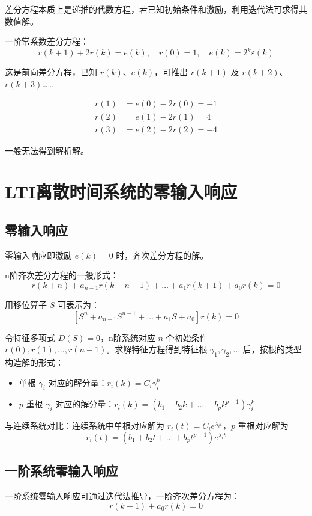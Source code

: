 \documentclass[UTF8]{ctexart}
\begin{document}
差分方程本质上是递推的代数方程，若已知初始条件和激励，利用迭代法可求得其数值解。

一阶常系数差分方程：
$$
r(k+1)+2 r(k)=e(k),\quad r(0)=1,\quad e(k)=2^{k} \varepsilon(k)
$$

这是前向差分方程，已知 $r(k)$、$e(k)$，可推出 $r(k+1)$ 及 $r(k+2)$、$r(k+3)$……

$$
\begin{aligned}
r(1)&=e(0)-2 r(0)=-1 \\
r(2)&=e(1)-2 r(1)=4 \\
r(3)&=e(2)-2 r(2)=-4
\end{aligned}
$$

一般无法得到解析解。

\section{LTI离散时间系统的零输入响应}

\subsection{零输入响应}

零输入响应即激励 $e(k)=0$ 时，齐次差分方程的解。

n阶齐次差分方程的一般形式：
$$
r(k+n)+a_{n-1} r(k+n-1)+\dots+a_{1} r(k+1)+a_{0} r(k)=0
$$

用移位算子 $S$ 可表示为：
$$
\left[S^{n}+a_{n-1} S^{n-1}+\dots+a_{1} S+a_{0}\right] r(k)=0
$$

令特征多项式 $D(S)=0$，n阶系统对应 $n$ 个初始条件 $r(0),r(1),\dots,r(n-1)$。求解特征方程得到特征根 $\gamma_1,\gamma_2,\dots$ 后，按根的类型构造解的形式：
\begin{itemize}
    \item 单根 $\gamma_i$ 对应的解分量：$r_i(k)=C_i \gamma_i^{k}$
    \item $p$ 重根 $\gamma_i$ 对应的解分量：$r_i(k)=\left(b_{1}+b_{2} k+\dots+b_{p} k^{p-1}\right) \gamma_{i}^{k}$
\end{itemize}

与连续系统对比：连续系统中单根对应解为 $r_i(t)=C_i e^{\lambda_i t}$，$p$ 重根对应解为
$$
r_i(t)=\left(b_{1}+b_{2} t+\dots+b_{p} t^{p-1}\right) e^{\lambda_i t}
$$

\subsection{一阶系统零输入响应}

一阶系统零输入响应可通过迭代法推导，一阶齐次差分方程为：
$$
r(k+1)+a_{0} r(k)=0
$$
\end{document}

